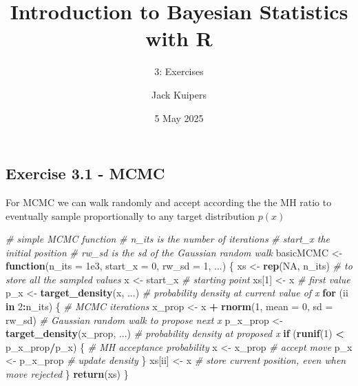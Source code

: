 \documentclass[
]{article}
\title{Introduction to Bayesian Statistics with R}
\subtitle{3: Exercises}
\author{Jack Kuipers}
\date{5 May 2025}
\newenvironment{Shaded}{\begin{snugshade}}{\end{snugshade}}
\newcommand{\AttributeTok}[1]{\textcolor[rgb]{0.13,0.29,0.53}{#1}}
\newcommand{\CommentTok}[1]{\textcolor[rgb]{0.56,0.35,0.01}{\textit{#1}}}
\newcommand{\ConstantTok}[1]{\textcolor[rgb]{0.56,0.35,0.01}{#1}}
\newcommand{\ControlFlowTok}[1]{\textcolor[rgb]{0.13,0.29,0.53}{\textbf{#1}}}
\newcommand{\DecValTok}[1]{\textcolor[rgb]{0.00,0.00,0.81}{#1}}
\newcommand{\FloatTok}[1]{\textcolor[rgb]{0.00,0.00,0.81}{#1}}
\newcommand{\FunctionTok}[1]{\textcolor[rgb]{0.13,0.29,0.53}{\textbf{#1}}}
\newcommand{\NormalTok}[1]{#1}
\newcommand{\OtherTok}[1]{\textcolor[rgb]{0.56,0.35,0.01}{#1}}
\newcommand{\SpecialCharTok}[1]{\textcolor[rgb]{0.81,0.36,0.00}{\textbf{#1}}}
\begin{document}
\maketitle

\subsection{Exercise 3.1 - MCMC}\label{exercise-3.1---mcmc}

For MCMC we can walk randomly and accept according the the MH ratio to
eventually sample proportionally to any target distribution \(p(x)\)

\begin{Shaded}
\begin{Highlighting}[]
\CommentTok{\# simple MCMC function}
\CommentTok{\# n\_its is the number of iterations}
\CommentTok{\# start\_x the initial position}
\CommentTok{\# rw\_sd is the sd of the Gaussian random walk}
\NormalTok{basicMCMC }\OtherTok{\textless{}{-}} \ControlFlowTok{function}\NormalTok{(}\AttributeTok{n\_its =} \FloatTok{1e3}\NormalTok{, }\AttributeTok{start\_x =} \DecValTok{0}\NormalTok{, }\AttributeTok{rw\_sd =} \DecValTok{1}\NormalTok{, ...) \{}
\NormalTok{  xs }\OtherTok{\textless{}{-}} \FunctionTok{rep}\NormalTok{(}\ConstantTok{NA}\NormalTok{, n\_its) }\CommentTok{\# to store all the sampled values}
\NormalTok{  x }\OtherTok{\textless{}{-}}\NormalTok{ start\_x }\CommentTok{\# starting point}
\NormalTok{  xs[}\DecValTok{1}\NormalTok{] }\OtherTok{\textless{}{-}}\NormalTok{ x }\CommentTok{\# first value}
\NormalTok{  p\_x }\OtherTok{\textless{}{-}} \FunctionTok{target\_density}\NormalTok{(x, ...) }\CommentTok{\# probability density at current value of x}
  \ControlFlowTok{for}\NormalTok{ (ii }\ControlFlowTok{in} \DecValTok{2}\SpecialCharTok{:}\NormalTok{n\_its) \{ }\CommentTok{\# MCMC iterations}
\NormalTok{    x\_prop }\OtherTok{\textless{}{-}}\NormalTok{ x }\SpecialCharTok{+} \FunctionTok{rnorm}\NormalTok{(}\DecValTok{1}\NormalTok{, }\AttributeTok{mean =} \DecValTok{0}\NormalTok{, }\AttributeTok{sd =}\NormalTok{ rw\_sd) }\CommentTok{\# Gaussian random walk to propose next x}
\NormalTok{    p\_x\_prop }\OtherTok{\textless{}{-}} \FunctionTok{target\_density}\NormalTok{(x\_prop, ...) }\CommentTok{\# probability density at proposed x}
    \ControlFlowTok{if}\NormalTok{ (}\FunctionTok{runif}\NormalTok{(}\DecValTok{1}\NormalTok{) }\SpecialCharTok{\textless{}}\NormalTok{ p\_x\_prop}\SpecialCharTok{/}\NormalTok{p\_x) \{ }\CommentTok{\# MH acceptance probability}
\NormalTok{      x }\OtherTok{\textless{}{-}}\NormalTok{ x\_prop }\CommentTok{\# accept move}
\NormalTok{      p\_x }\OtherTok{\textless{}{-}}\NormalTok{ p\_x\_prop }\CommentTok{\# update density}
\NormalTok{    \}}
\NormalTok{    xs[ii] }\OtherTok{\textless{}{-}}\NormalTok{ x }\CommentTok{\# store current position, even when move rejected}
\NormalTok{  \}}
  \FunctionTok{return}\NormalTok{(xs)}
\NormalTok{\}}
\end{Highlighting}
\end{Shaded}
\end{document}
